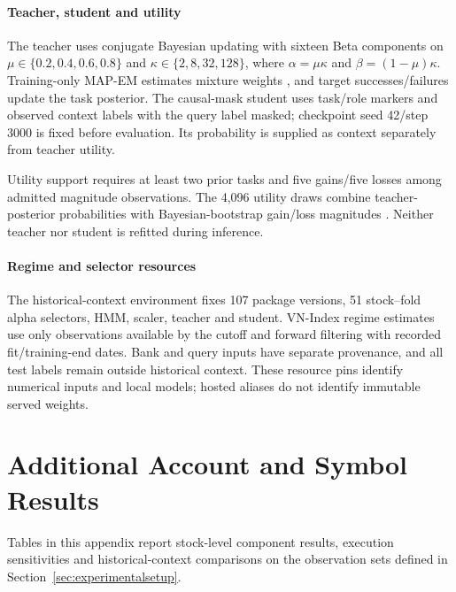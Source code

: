 \paragraph{Teacher, student and utility}
The teacher uses conjugate Bayesian updating \cite{gelman2013bayesian} with sixteen Beta components on $\mu\in\{0.2,0.4,0.6,0.8\}$ and $\kappa\in\{2,8,32,128\}$, where $\alpha=\mu\kappa$ and $\beta=(1-\mu)\kappa$. Training-only MAP-EM estimates mixture weights \cite{dempster1977em}, and target successes/failures update the task posterior. The causal-mask student uses task/role markers and observed context labels with the query label masked; checkpoint seed 42/step 3000 is fixed before evaluation. Its probability is supplied as context separately from teacher utility.

Utility support requires at least two prior tasks and five gains/five losses among admitted magnitude observations. The 4,096 utility draws combine teacher-posterior probabilities with Bayesian-bootstrap gain/loss magnitudes \cite{rubin1981bootstrap}. Neither teacher nor student is refitted during inference.

\paragraph{Regime and selector resources}
The historical-context environment fixes 107 package versions, 51 stock--fold alpha selectors, HMM, scaler, teacher and student. VN-Index regime estimates use only observations available by the cutoff and forward filtering with recorded fit/training-end dates. Bank and query inputs have separate provenance, and all test labels remain outside historical context. These resource pins identify numerical inputs and local models; hosted aliases do not identify immutable served weights.

\FloatBarrier
\setcounter{table}{0}
\section{Additional Account and Symbol Results}
\label{app:additional}
Tables in this appendix report stock-level component results, execution sensitivities and historical-context comparisons on the observation sets defined in Section~\ref{sec:experimentalsetup}.


\FloatBarrier

